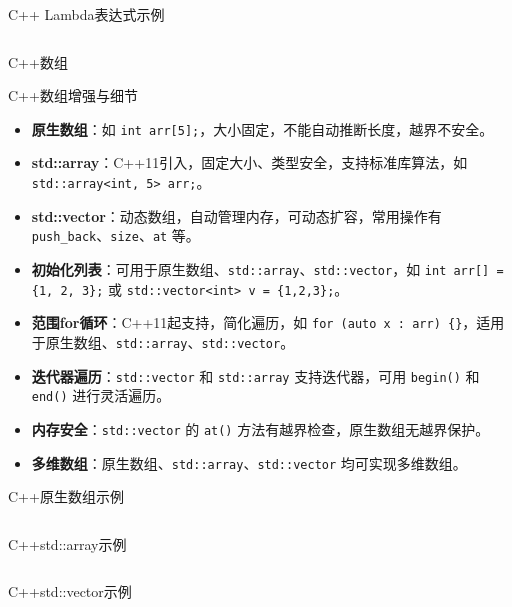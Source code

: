 \documentclass[UTF8,aspectratio=169]{beamer}
\begin{document}
\begin{frame}[fragile]{C++ Lambda表达式示例}
    \inputminted[firstline=1,lastline=18]{cpp}{code/cpp_lambda_example.cpp}
\end{frame}

\begin{frame}{C++数组}
    \begin{ytublock}{C++数组增强与细节}
        \begin{itemize}
            \item \textbf{原生数组}：如 \texttt{int arr[5];}，大小固定，不能自动推断长度，越界不安全。
            \item \textbf{std::array}：C++11引入，固定大小、类型安全，支持标准库算法，如 \texttt{std::array<int, 5> arr;}。
            \item \textbf{std::vector}：动态数组，自动管理内存，可动态扩容，常用操作有 \texttt{push\_back}、\texttt{size}、\texttt{at} 等。
            \item \textbf{初始化列表}：可用于原生数组、\texttt{std::array}、\texttt{std::vector}，如 \texttt{int arr[] = \{1, 2, 3\};} 或 \texttt{std::vector<int> v = \{1,2,3\};}。
            \item \textbf{范围for循环}：C++11起支持，简化遍历，如 \texttt{for (auto x : arr) \{\}}，适用于原生数组、\texttt{std::array}、\texttt{std::vector}。
            \item \textbf{迭代器遍历}：\texttt{std::vector} 和 \texttt{std::array} 支持迭代器，可用 \texttt{begin()} 和 \texttt{end()} 进行灵活遍历。
            \item \textbf{内存安全}：\texttt{std::vector} 的 \texttt{at()} 方法有越界检查，原生数组无越界保护。
            \item \textbf{多维数组}：原生数组、\texttt{std::array}、\texttt{std::vector} 均可实现多维数组。
        \end{itemize}
    \end{ytublock}
\end{frame}

\begin{frame}[fragile]{C++原生数组示例}
    \inputminted[firstline=1,lastline=20]{cpp}{code/cpp_array_example.cpp}
\end{frame}

\begin{frame}[fragile]{C++std::array示例}
    \inputminted[firstline=1,lastline=20]{cpp}{code/cpp_stdarray_example.cpp}
\end{frame}

\begin{frame}[fragile]{C++std::vector示例}
        \begin{columns}
        \begin{column}{0.48\textwidth}
            \inputminted[firstline=1,lastline=17]{cpp}{code/cpp_vector_example.cpp}
        \end{column}
        \begin{column}{0.48\textwidth}
            \inputminted[firstline=18,lastline=38]{cpp}{code/cpp_vector_example.cpp}
        \end{column}
    \end{columns}
\end{frame}
\end{document}
